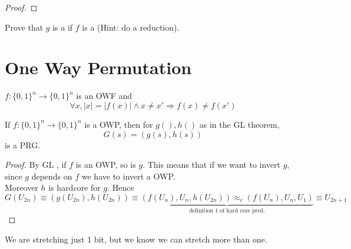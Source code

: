 \begin{proof}
\end{proof}

\begin{exercise}
    Prove that $g$ is a \owf{} if $f$ is a \owf{} (Hint: do a reduction).
\end{exercise}

\section{One Way Permutation}
$f:{\{0,1\}^{n}} \to {\{0,1\}^{n}} $ is an OWF and 
\[
    \forall x, |x|=|f(x)| \wedge  x \not= x' \Rightarrow f(x) \not= f(x')
\]

\begin{cor}
    If $f:\{0,1\}^{n} \to \{0,1\}^{n} $ is a OWP, then for $g(), h()$ as in the
    GL theorem,
    \[
        G(s)=(g(s), h(s))
    \]
    is a PRG.
\end{cor}

\begin{proof}
    By GL , if $f$ is an OWP, so is $g$. This means that if we want to invert
    $g$, since $g$ depends on $f$ we have to invert a OWP.\\
    Moreover $h$ is hardcore for $g$.
    Hence
    \[
        G(U_{2n}) \equiv (g(U_{2n}), h(U_{2n})) \equiv \underbrace{(f(U_{n}), U_{n},
        h(U_{2n})) \approx_{c}(f(U_{n}), U_{n}, U_{1})}_{\text{definition 1 of hard core pred.}}  \equiv U_{2n+1}
    \]

\end{proof}

We are stretching just 1 bit, but we know we can stretch more than one.
\pagebreak
